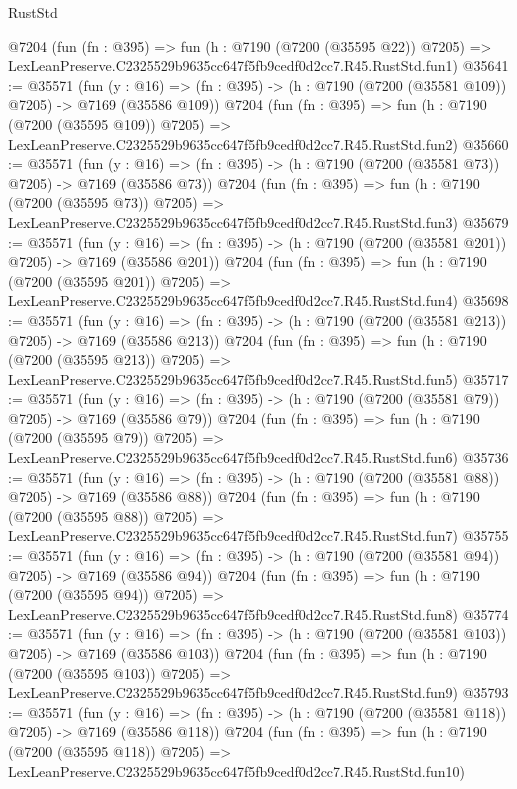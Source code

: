 \begin{lexlean}{RustStd}
\begin{coremodule}
    @7204
    (fun (fn : @395) =>
    fun (h : @7190 (@7200 (@35595 @22)) @7205) =>
    LexLeanPreserve.C2325529b9635cc647f5fb9cedf0d2cc7.R45.RustStd.fun1)
@35641 := @35571
    (fun (y : @16) => (fn : @395) -> (h : @7190 (@7200 (@35581 @109)) @7205) -> @7169 (@35586 @109))
    @7204
    (fun (fn : @395) =>
    fun (h : @7190 (@7200 (@35595 @109)) @7205) =>
    LexLeanPreserve.C2325529b9635cc647f5fb9cedf0d2cc7.R45.RustStd.fun2)
@35660 := @35571
    (fun (y : @16) => (fn : @395) -> (h : @7190 (@7200 (@35581 @73)) @7205) -> @7169 (@35586 @73))
    @7204
    (fun (fn : @395) =>
    fun (h : @7190 (@7200 (@35595 @73)) @7205) =>
    LexLeanPreserve.C2325529b9635cc647f5fb9cedf0d2cc7.R45.RustStd.fun3)
@35679 := @35571
    (fun (y : @16) => (fn : @395) -> (h : @7190 (@7200 (@35581 @201)) @7205) -> @7169 (@35586 @201))
    @7204
    (fun (fn : @395) =>
    fun (h : @7190 (@7200 (@35595 @201)) @7205) =>
    LexLeanPreserve.C2325529b9635cc647f5fb9cedf0d2cc7.R45.RustStd.fun4)
@35698 := @35571
    (fun (y : @16) => (fn : @395) -> (h : @7190 (@7200 (@35581 @213)) @7205) -> @7169 (@35586 @213))
    @7204
    (fun (fn : @395) =>
    fun (h : @7190 (@7200 (@35595 @213)) @7205) =>
    LexLeanPreserve.C2325529b9635cc647f5fb9cedf0d2cc7.R45.RustStd.fun5)
@35717 := @35571
    (fun (y : @16) => (fn : @395) -> (h : @7190 (@7200 (@35581 @79)) @7205) -> @7169 (@35586 @79))
    @7204
    (fun (fn : @395) =>
    fun (h : @7190 (@7200 (@35595 @79)) @7205) =>
    LexLeanPreserve.C2325529b9635cc647f5fb9cedf0d2cc7.R45.RustStd.fun6)
@35736 := @35571
    (fun (y : @16) => (fn : @395) -> (h : @7190 (@7200 (@35581 @88)) @7205) -> @7169 (@35586 @88))
    @7204
    (fun (fn : @395) =>
    fun (h : @7190 (@7200 (@35595 @88)) @7205) =>
    LexLeanPreserve.C2325529b9635cc647f5fb9cedf0d2cc7.R45.RustStd.fun7)
@35755 := @35571
    (fun (y : @16) => (fn : @395) -> (h : @7190 (@7200 (@35581 @94)) @7205) -> @7169 (@35586 @94))
    @7204
    (fun (fn : @395) =>
    fun (h : @7190 (@7200 (@35595 @94)) @7205) =>
    LexLeanPreserve.C2325529b9635cc647f5fb9cedf0d2cc7.R45.RustStd.fun8)
@35774 := @35571
    (fun (y : @16) => (fn : @395) -> (h : @7190 (@7200 (@35581 @103)) @7205) -> @7169 (@35586 @103))
    @7204
    (fun (fn : @395) =>
    fun (h : @7190 (@7200 (@35595 @103)) @7205) =>
    LexLeanPreserve.C2325529b9635cc647f5fb9cedf0d2cc7.R45.RustStd.fun9)
@35793 := @35571
    (fun (y : @16) => (fn : @395) -> (h : @7190 (@7200 (@35581 @118)) @7205) -> @7169 (@35586 @118))
    @7204
    (fun (fn : @395) =>
    fun (h : @7190 (@7200 (@35595 @118)) @7205) =>
    LexLeanPreserve.C2325529b9635cc647f5fb9cedf0d2cc7.R45.RustStd.fun10)

\end{coremodule}
\end{lexlean}
